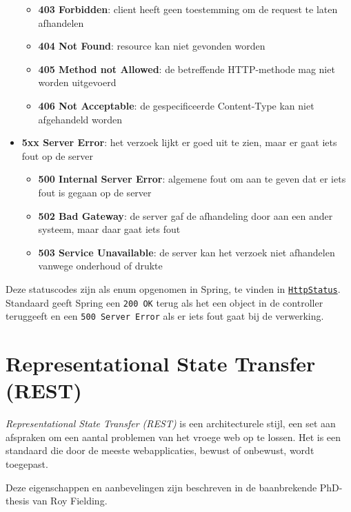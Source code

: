 \begin{itemize}
\begin{itemize}
        \item \textbf{403 Forbidden}: client heeft geen toestemming om de request te laten afhandelen
        \item \textbf{404 Not Found}: resource kan niet gevonden worden
        \item \textbf{405 Method not Allowed}: de betreffende HTTP-methode mag niet worden uitgevoerd
        \item \textbf{406 Not Acceptable}: de gespecificeerde Content-Type kan niet afgehandeld worden
    \end{itemize}
    \item \textbf{5xx Server Error}: het verzoek lijkt er goed uit te zien, maar er gaat iets fout op de server
    \begin{itemize}
        \item \textbf{500 Internal Server Error}: algemene fout om aan te geven dat er iets fout is gegaan op de server
        \item \textbf{502 Bad Gateway}: de server gaf de afhandeling door aan een ander systeem, maar daar gaat iets fout
        \item \textbf{503 Service Unavailable}: de server kan het verzoek niet afhandelen vanwege onderhoud of drukte
    \end{itemize}
\end{itemize}

Deze statuscodes zijn als enum opgenomen in Spring, te vinden in 
\href{https://docs.spring.io/spring-framework/docs/current/javadoc-api/org/springframework/http/HttpStatus.html}{\texttt{HttpStatus}}.
Standaard geeft Spring een \texttt{200 OK} terug als het een object in de controller teruggeeft
en een \texttt{500 Server Error} als er iets fout gaat bij de verwerking.

\section{Representational State Transfer (REST)}
\textit{Representational State Transfer (REST)} is een architecturele stijl,
een set aan afspraken om een aantal problemen van het vroege web op te lossen.
Het is een standaard die door de meeste webapplicaties,
bewust of onbewust, wordt toegepast.

Deze eigenschappen en aanbevelingen zijn beschreven in de baanbrekende 
PhD-thesis van Roy Fielding.

